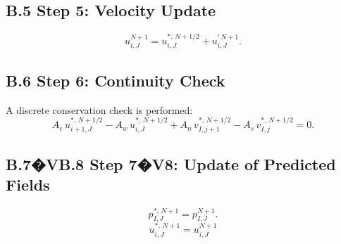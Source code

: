 \documentclass[12pt]{article}
\theoremstyle{plain}  %
\theoremstyle{definition}  %
\begin{document}
\subsection*{B.5 \quad Step 5: Velocity Update}

\begin{equation}
u_{i,J}^{N+1}
= u_{i,J}^{*,\,N+1/2}
+ u_{i,J}^{\prime\,N+1}.
\label{eq:eq5}
\end{equation}

\subsection*{B.6 \quad Step 6: Continuity Check}

A discrete conservation check is performed:
\begin{equation}
A_e\,u_{i+1,J}^{*,\,N+1/2}
- A_w\,u_{i,J}^{*,\,N+1/2}
+ A_n\,v_{I,j+1}^{*,\,N+1/2}
- A_s\,v_{I,j}^{*,\,N+1/2}
= 0.
\label{eq:eq6}
\end{equation}

\subsection*{B.7�VB.8 \quad Step 7�V8: Update of Predicted Fields}


\begin{equation}
\label{eq:eq7}
p_{I,J}^{*,\,N+1} = p_{I,J}^{N+1}.
\end{equation}
\begin{equation}
\label{eq:eq8}
u_{i,J}^{*,\,N+1} = u_{i,J}^{N+1}
\end{equation}
\end{document}
